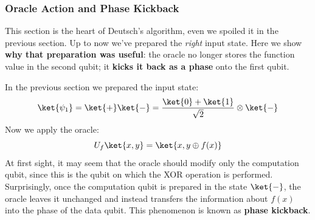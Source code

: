 \subsubsection{Oracle Action and Phase Kickback}\label{ex:oracle-action-and-phase-kickback}

This section is the heart of Deutsch's algorithm, even we spoiled it in the previous section. Up to now we've prepared the \emph{right} input state. Here we show \textbf{why that preparation was useful}: the oracle no longer stores the function value in the second qubit; it \textbf{kicks it back as a phase} onto the first qubit.

\highspace
In the previous section we prepared the input state:
\begin{equation*}
    \ket{\psi_1} = \ket{+} \ket{-} = \frac{\ket{0} + \ket{1}}{\sqrt{2}} \otimes \ket{-}
\end{equation*}
Now we apply the oracle:
\begin{equation*}
    U_f \ket{x, y} = \ket{x, y \oplus f(x)}
\end{equation*}
At first sight, it may seem that the oracle should modify only the computation qubit, since this is the qubit on which the XOR operation is performed. Surprisingly, once the computation qubit is prepared in the state $\ket{-}$, the oracle leaves it unchanged and instead transfers the information about $f(x)$ into the phase of the data qubit. This phenomenon is known as \textbf{phase kickback}.

